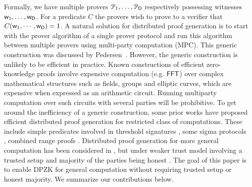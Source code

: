 Formally, we have multiple provers $\mathcal{P}_1, \ldots, \mathcal{P}_{\mathsf{D}}$
respectively possessing witnesses $\mathsf{w}_1, \ldots, \mathsf{w}_{\mathsf{D}}$. For a predicate $C$ the provers wish to prove to a verifier that $C(\mathsf{w}_1,\cdots,\mathsf{w}_{\mathsf{D}}) = 1$.  
A natural solution for distributed
proof generation is to start with the prover algorithm of a single prover
protocol and run this algorithm between multiple provers using multi-party computation (MPC). This generic construction was discussed by Pedersen~\cite{Ped92}. 
However, the generic construction is unlikely to be efficient in practice. Known constructions of efficient zero-knowledge proofs involve
expensive computation (e.g. $\mathsf{FFT}$) over complex mathematical structures such as fields, groups and elliptic curves, which are expensive when expressed
as an arithmetic circuit. Running multiparty computation over such circuits with several parties will be prohibitive. 
To get around the inefficiency of a generic construction, some prior works have proposed efficient distributed proof generation for 
restricted class of computations.
These include simple predicates involved in threshold signatures \cite{DDS}, some sigma protocols \cite{EfficientTZ}, 
combined range proofs \cite{bulletproofs}. Distributed proof generation for more general computation has been considered in \cite{trinocchio}, but under
weaker trust model involving a trusted setup and majority of the parties
being honest \cite{trinocchio}. The goal of this paper is to enable DPZK for general computation without requiring trusted setup or honest majority. 
We summarize our contributions below.
